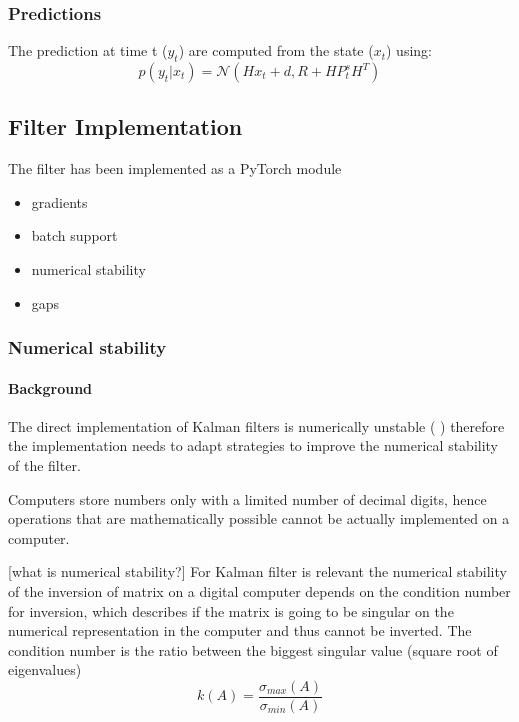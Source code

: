 \documentclass{article}
\begin{document}
\subsubsection{Predictions}

The prediction at time t ($y_t$) are computed from the state ($x_t$) using:
$$p(y_t|x_t) = \mathcal{N}(Hx_t + d, R + HP^s_tH^T)$$

\subsection{Filter Implementation}

The filter has been implemented as a PyTorch module

\begin{itemize}
    \item gradients
    \item batch support
    \item numerical stability
    \item gaps
\end{itemize}


\subsubsection{Numerical stability}

\paragraph{Background}
The direct implementation of Kalman filters is numerically unstable (\cite{mohinder_s_grewal_kalman_2001} \cite{dan_simon_optimal_2006}) therefore the implementation needs to adapt strategies to improve the numerical stability of the filter.

Computers store numbers only with a limited number of decimal digits, hence operations that are mathematically possible cannot be actually implemented on a computer.

[what is numerical stability?]
For Kalman filter is relevant the numerical stability of the inversion of matrix on a digital computer depends on the condition number for inversion, which describes if the matrix is going to be singular on the numerical representation in the computer and thus cannot be inverted. The condition number is the ratio between the biggest singular value (square root of eigenvalues)
\begin{equation}\label{condition_number}
    k(A) = \frac{\sigma_{max}(A)}{\sigma_{min}(A)}
\end{equation}
\end{document}
